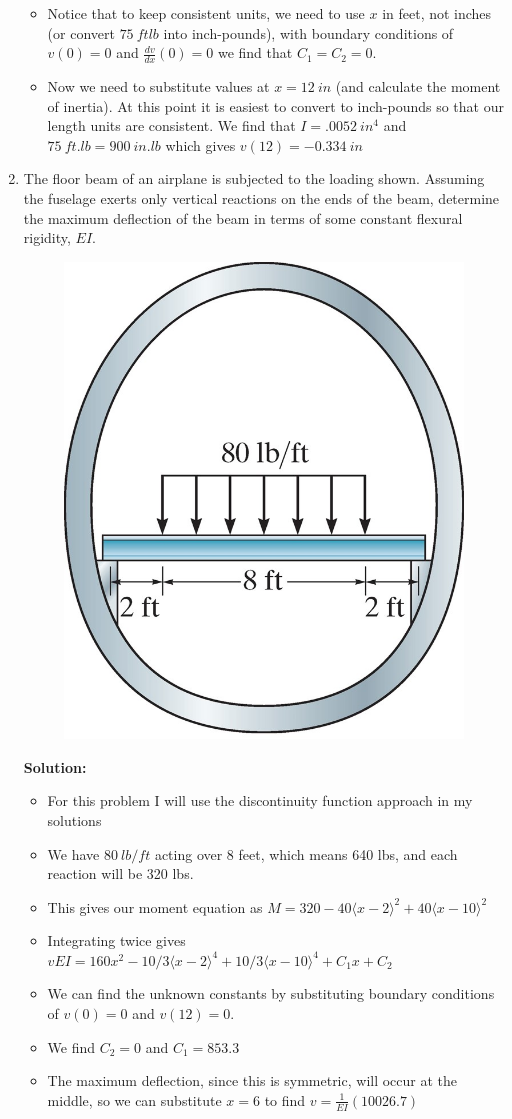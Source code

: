 \documentclass[12pt, oneside]{article}
\let\US\SI
\begin{document}
\begin{enumerate}
\begin{itemize}
				\item Notice that to keep consistent units, we need to use $x$ in feet, not inches (or convert $ 	\US{75}{ft lb} $ into inch-pounds), with boundary conditions of $v(0) = 0$ and $\frac{dv}{dx}(0) = 0$ we find that $C_1 = C_2 = 0$.
				\item Now we need to substitute values at $x = 	\US{12}{in} $ (and calculate the moment of inertia). At this point it is easiest to convert to inch-pounds so that our length units are consistent. We find that $I=\US{.0052}{in^4}$ and $ 	\US{75}{ft.lb} = 	\US{900}{in.lb}$ which gives $v(12) = 	\US{-0.334}{in} $
			\end{itemize}

	\item %
		The floor beam of an airplane is subjected to the loading shown.
		Assuming the fuselage exerts only vertical reactions on the ends of the beam, determine the maximum deflection of the beam in terms of some constant flexural rigidity, $EI$.
		\begin{figure}[H]
			\centering
			\includegraphics[width=0.6\linewidth]{12-25}
		\end{figure}
			\textbf{Solution:}
			\begin{itemize}
				\item For this problem I will use the discontinuity function approach in my solutions
				\item We have $ 	\US{80}{lb/ft}  $ acting over 8 feet, which means 640 lbs, and each reaction will be 320 lbs.
				\item This gives our moment equation as $M = 320 - 40 \langle x-2 \rangle^2 + 40 \langle x-10 \rangle^2$
				\item Integrating twice gives $v EI = 160x^2 - 10/3 \langle x-2 \rangle^4 + 10/3 \langle x-10 \rangle^4 + C_1x + C_2$
				\item We can find the unknown constants by substituting boundary conditions of $v(0) = 0$ and $v(12) = 0$.
				\item We find $C_2 = 0$ and $C_1 = 853.3$
				\item The maximum deflection, since this is symmetric, will occur at the middle, so we can substitute $x=6$ to find $v = \frac{1}{EI}(10026.7)$
			\end{itemize}


\end{enumerate}
\end{document}
